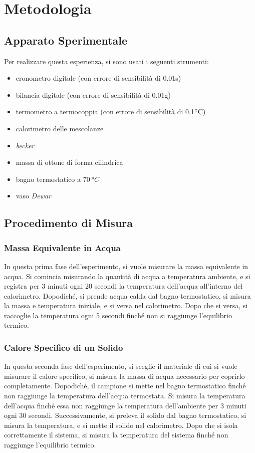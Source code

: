 \documentclass[a4paper]{article}
\begin{document}
\section{Metodologia}
\subsection{Apparato Sperimentale}
Per realizzare questa esperienza, si sono usati i seguenti strumenti:
\begin{itemize}
    \item cronometro digitale (con errore di sensibilità di 0.01s)
    \item bilancia digitale (con errore di sensibilità di 0.01g)
    \item termometro a termocoppia (con errore di sensibilità di 0.1$\degree \SI{}{C})$
    \item calorimetro delle mescolanze
    \item \textit{becker}
    \item massa di ottone di forma cilindrica
    \item bagno termostatico a $\SI{70}{\degree C}$
    \item vaso \textit{Dewar}
\end{itemize}

\subsection{Procedimento di Misura}
\subsubsection{Massa Equivalente in Acqua}
In questa prima fase dell'esperimento, si vuole misurare la massa equivalente in acqua. Si comincia misurando la quantità di acqua a temperatura ambiente, e si registra per 3 minuti ogni 20 secondi la temperatura dell'acqua all'interno del calorimetro. Dopodiché, si prende acqua calda dal bagno termostatico, si misura la massa e temperatura iniziale, e si versa nel calorimetro. Dopo che si versa, si raccoglie la temperatura ogni 5 secondi finché non si raggiunge l'equilibrio termico. 

\subsubsection{Calore Specifico di un Solido}
In questa seconda fase dell'esperimento, si sceglie il materiale di cui si vuole misurare il calore specifico, si misura la massa di acqua necessario per coprirlo completamente. Dopodiché, il campione si mette nel bagno termostatico finché non raggiunge la temperatura dell'acqua termostata. Si misura la temperatura dell'acqua finché essa non raggiunge la temperatura dell'ambiente per 3 minuti ogni 30 secondi. Successivamente, si preleva il solido dal bagno termostatico, si misura la temperatura, e si mette il solido nel calorimetro. Dopo che si isola correttamente il sistema, si misura la temperatura del sistema finché non raggiunge l'equilibrio termico. 
\end{document}
